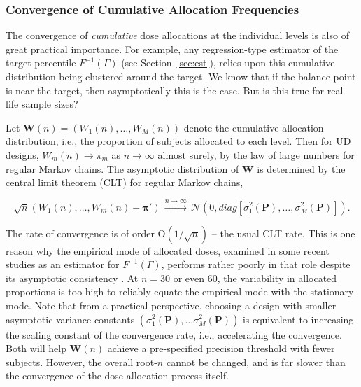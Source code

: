 \subsubsection{Convergence of Cumulative Allocation Frequencies}\label{sec:asymvar}

The convergence of \emph{cumulative} dose allocations at the individual levels is also of great practical importance. For example, any regression-type estimator of the target percentile $F^{-1}(\Gamma)$ (see Section~\ref{sec:est}), relies upon this cumulative distribution being clustered around the target. We know that if the balance point is near the target, then asymptotically this is the case. But is this true for real-life sample sizes?

Let $\mathbf{W}(n)=\left(W_1(n),\ldots ,W_M(n)\right)$ denote the cumulative allocation distribution, i.e., the proportion of subjects allocated to each level. Then for UD designs, $W_m(n)\to\pi_m$ as $n\rightarrow \infty$ almost surely, by the law of large numbers for regular Markov chains. The asymptotic distribution of $\mathbf{W}$ is determined by the central limit theorem (CLT) for regular Markov chains,

\begin{equation}\label{eq:CLT}
\sqrt{n}\left(W_1(n),\ldots, W_m(n)-\boldsymbol{\pi}\prime\right)\,\stackrel{n
\rightarrow \infty}{\longrightarrow}
\,\mathcal{N}\left(0,diag\left[\sigma_1^2(\mathbf{P})
,\ldots ,\sigma_M^2(\mathbf{P})\right] \right).
\end{equation}

The rate of convergence is of order $\mathrm{O}\left(1/\sqrt{n}\right)$ -- the usual CLT rate. This is one reason why the empirical mode of allocated doses, examined in some recent studies as an estimator for $F^{-1}(\Gamma)$, performs rather poorly in that role despite its asymptotic consistency \citep{Giov:Pint:Pint:prop:1998}. At $n=30$ or even $60$, the variability in allocated proportions is too high to reliably equate the empirical mode with the stationary mode. Note that from a practical perspective, choosing a design with smaller asymptotic variance constants $\left(\sigma_1^2(\mathbf{P}),\ldots\sigma_M^2(\mathbf{P})\right)$ is equivalent to increasing the scaling constant of the convergence rate, i.e., accelerating the convergence. Both will help $\mathbf{W}(n)$ achieve a pre-specified precision threshold with fewer subjects. However, the overall root-$n$ cannot be changed, and is far slower than the convergence of the dose-allocation process itself.

